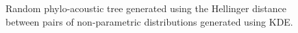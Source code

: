 \documentclass[pdftex,11pt,a4paper]{article}
\theoremstyle{definition}
\theoremstyle{remark}
\begin{document}
\begin{figure}
\noindent{}
    \caption{Random phylo-acoustic tree generated using the Hellinger distance between pairs of non-parametric distributions generated using KDE.}
    \label{fig:rkdehellinger}
\end{figure}
\end{document}
